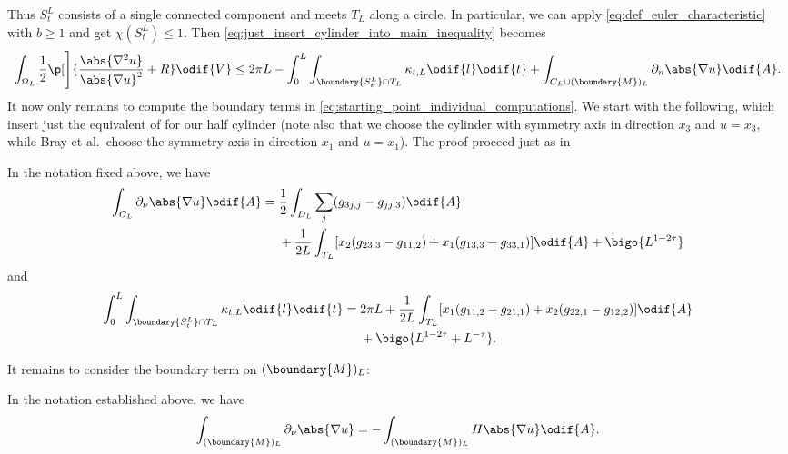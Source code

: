 \documentclass[titlepage,numbers=noenddot,headinclude,oneside,%
footinclude=true,cleardoublepage=empty,%
BCOR=5mm,paper=a4,fontsize=11pt,%
english,%
]{scrartcl}
\begin{document}
Thus \( S_t^L \) consists of a single connected component and meets \( T_L \) along a circle. In particular, we can apply \cref{eq:def_euler_characteristic} with \( b\geq 1 \) and get \( \chi(S_t^L)\leq 1 \). Then \cref{eq:just_insert_cylinder_into_main_inequality} becomes
\begin{equation}
    \int_{\Omega_L} \frac{1}{2}\p[\Bigg]{\frac{\abs{\nabla^2 u}}{\abs{\nabla u}^2}+R }\odif{V} \leq2\pi L- \int_{0}^{L}\int _{\boundary{S_t^L} \cap T_L}\kappa_{t,L}\odif{l}\odif{t}+ \int_{C_L\cup (\boundary{M})_L}\partial_{n} \abs{\nabla u}\odif{A}.\label{eq:starting_point_individual_computations}
\end{equation}
It now only remains to compute the boundary terms in \cref{eq:starting_point_individual_computations}. We start with the following, which insert just the equivalent of \cite[Lemma 6.1 and Lemma 6.2]{brayHarmonicFunctionsMass2019} for our half cylinder (note also that we choose the cylinder with symmetry axis in direction \( x_3 \) and \( u=x_3 \), while Bray et al.~choose the symmetry axis in direction \( x_1 \) and \( u=x_1 \)). The proof proceed just as in \cite[Lemma 6.1 and Lemma 6.2]{brayHarmonicFunctionsMass2019}
\begin{lemma}\label{lem:cylinder_boundary_term}
    In the notation fixed above, we have
    \begin{equation*}
        \int_{C_L} \partial_\nu\abs{\nabla u}\odif{A}=\begin{aligned}[t]
            &\frac{1}{2}\int_{D_L}\sum_{j}(g_{3j,j}-g_{jj,3})\odif{A}\\
            &+\frac{1}{2L}\int_{T_L}[x_2(g_{23,3}-g_{11,2})+x_1  (g_{13,3}-g_{33,1})]\odif{A}+\bigo{L^{1-2\tau}}
        \end{aligned}
    \end{equation*}
    and
    \begin{equation*}
        \int_0^L\int_{\boundary{S_t^L} \cap T_L}\kappa_{t,L}\odif{l}\odif{t}=\begin{aligned}[t]
            &2\pi L +\frac{1}{2L}\int_{T_L}[x_1(g_{11,2}-g_{21,1})+x_2(g_{22,1}-g_{12,2})]\odif{A}\\
            &+\bigo{L^{1-2\tau}+L^{-\tau}}.
        \end{aligned}
    \end{equation*}
\end{lemma}
It remains to consider the boundary term on \( (\boundary{M})_L \):
\begin{lemma}\label{lem:half_space_boundary_boundary_term}
    In the notation established above, we have
    \begin{equation*}
        \int_{(\boundary{M})_L} \partial_\nu \abs{\nabla u}=-\int_{(\boundary{M})_L}H\abs{\nabla u}\odif{A}.
    \end{equation*}
\end{lemma}
\end{document}
